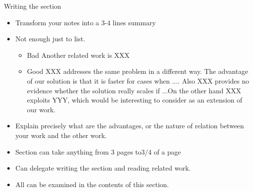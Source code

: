 Writing the section
\begin{itemize}
\item Transform your notes into a 3-4 lines summary
\item Not enough just to list.
  \begin{itemize}
  \item Bad Another related work is XXX
  \item Good XXX addresses the same problem in a different way. The advantage of our solution is that it is faster for cases when .... Also XXX provides no evidence whether the solution really scales if ...On the other hand XXX exploits YYY, which would be interesting to consider as an extension of our work.
  \end{itemize}
\item Explain precisely what are the advantages, or the nature of relation between your work and the other work.
\item Section can take anything from 3 pages to3/4 of a page
\item Can delegate writing the section and reading related work.
\item All can be examined in the contents of this section.
\end{itemize}